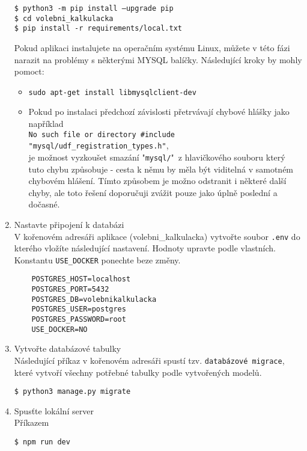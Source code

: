 \begin{enumerate}
    \texttt{\$ python3 -m pip install –upgrade pip}\\
    \texttt{\$ cd volebni\_kalkulacka}\\
    \texttt{\$ pip install -r requirements/local.txt}

    Pokud aplikaci instalujete na operačním systému Linux, můžete v této fázi narazit na problémy s některými MYSQL balíčky. Následující kroky by mohly pomoct:
    \begin{itemize}
        \item \texttt{sudo apt-get install libmysqlclient-dev}
        \item Pokud po instalaci předchozí závislosti přetrvávají chybové hlášky jako například \\
        \texttt{No such file or directory \#include "mysql/udf\_registration\_types.h"},\\
        je možnost vyzkoušet smazání "\texttt{mysql/}"\ z hlavičkového souboru který tuto chybu způsobuje - cesta k němu by měla být viditelná v samotném chybovém hlášení. Tímto způsobem je možno odstranit i některé další chyby, ale toto řešení doporučuji zvážit pouze jako úplně poslední a dočasné.
    \end{itemize}
    
    \item Nastavte připojení k databázi\\
    V kořenovém adresáři aplikace (volebni\_kalkulacka) vytvořte soubor \texttt{.env} do kterého vložíte následující nastavení. Hodnoty upravte podle vlastních. Konstantu \texttt{USE\_DOCKER} ponechte beze změny.
    \begin{verbatim}
    POSTGRES_HOST=localhost
    POSTGRES_PORT=5432
    POSTGRES_DB=volebnikalkulacka
    POSTGRES_USER=postgres
    POSTGRES_PASSWORD=root
    USE_DOCKER=NO
    \end{verbatim}
    
    \item Vytvořte databázové tabulky\\
    Následující příkaz v kořenovém adresáři spustí tzv. \texttt{databázové migrace}, které vytvoří všechny potřebné tabulky podle vytvořených modelů. 

    \texttt{\$ python3 manage.py migrate}

    \item Spusťte lokální server\\
    Příkazem
    
    \texttt{\$ npm run dev}
    

\end{enumerate}
